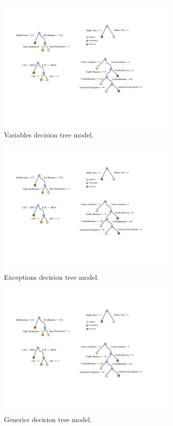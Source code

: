 \begin{figure} [h]
	\centering
	\includegraphics[width=3.5in]{Chapter-6/figs/variables.pdf}
	\caption{Variables decision tree model.}
	\label{fig:vars}
\end{figure}

\begin{figure} [h]
	\centering
	\includegraphics[width=3.5in]{Chapter-6/figs/exceptions.pdf}
	\caption{Exceptions decision tree model.}
	\label{fig:excep}
\end{figure}

\begin{figure} [h]
	\centering
	\includegraphics[width=3.5in]{Chapter-6/figs/generics.pdf}
	\caption{Generics decision tree model.}
	\label{fig:gen}
\end{figure}


